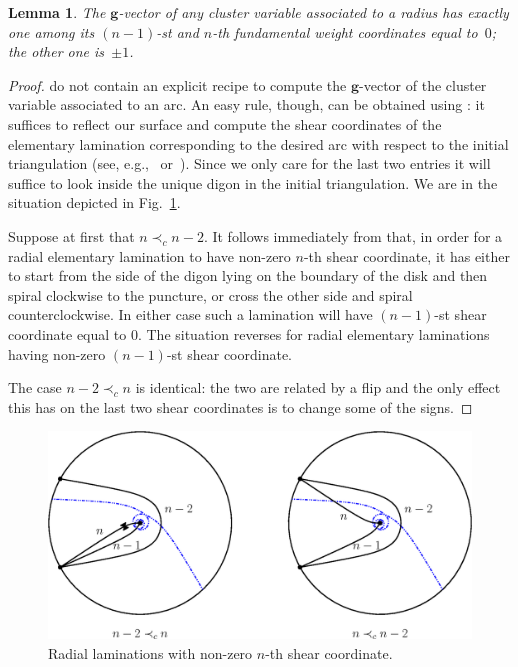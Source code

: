 \documentclass[pdftex]{sigma}
\numberwithin{equation}{section}
\newtheorem{Lemma}[Theorem]{Lemma}
\newcommand{\bg}{\mathbf{g}}
\begin{document}
  \begin{Lemma} \label{lem:g-vector-of-radii}
    The $\bg$-vector of any cluster variable associated to a radius has exactly one among its $(n-1)$-st and $n$-th fundamental weight coordinates equal to~$0$; the other one is~$\pm 1$.
  \end{Lemma}
  \begin{proof}
    \cite{FST08,FT12} do not contain an explicit recipe to compute the $\bg$-vector of the cluster variable associated to an arc.
    An easy rule, though, can be obtained using \cite[equation~(1.13)]{NZ12}: it suf\/f\/ices to ref\/lect our surface and compute the shear coordinates of the elementary lamination corresponding to the desired arc with respect to the initial triangulation (see, e.g.,~\cite[Proposition~5.2]{Re14} or~\cite[Lemma~8.6]{FeTu15}).
    Since we only care for the last two entries it will suf\/f\/ice to look inside the unique digon in the initial triangulation.
    We are in the situation depicted in Fig.~\ref{fig:D_n-weights}.

    Suppose at f\/irst that $n \prec_c n-2$.
    It follows immediately from \cite[Fig.~36]{FT12} that, in order for a radial elementary lamination to have non-zero $n$-th shear coordinate, it has either to start from the side of the digon lying on the boundary of the disk and then spiral clockwise to the puncture, or cross the other side and spiral counterclockwise.
    In either case such a lamination will have $(n-1)$-st shear coordinate equal to $0$.
    The situation reverses for radial elementary laminations having non-zero $(n-1)$-st shear coordinate.

    The case $n-2 \prec_c n$ is identical: the two are related by a f\/lip and the only ef\/fect this has on the last two shear coordinates is to change some of the signs.
  \end{proof}

  \begin{figure}[t]\centering
    \includegraphics[scale=0.6]{D_n-weights.eps}
    \caption{Radial laminations with non-zero $n$-th shear coordinate.}
    \label{fig:D_n-weights}
  \end{figure}
\end{document}
